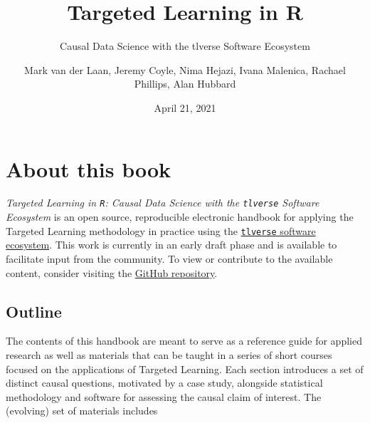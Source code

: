 \documentclass[12pt, krantz2,]{krantz}
\title{Targeted Learning in R}
\subtitle{Causal Data Science with the tlverse Software Ecosystem}
\author{Mark van der Laan, Jeremy Coyle, Nima Hejazi, Ivana Malenica, Rachael Phillips, Alan Hubbard}
\date{April 21, 2021}
\theoremstyle{definition}
\theoremstyle{definition}
\theoremstyle{definition}
\newcommand{\1}{\mathbbm{1}}
\begin{document}
\maketitle


\thispagestyle{empty}

\begin{center}
\end{center}

\setlength{\abovedisplayskip}{-5pt}
\setlength{\abovedisplayshortskip}{-5pt}

\mainmatter

{
\hypersetup{linkcolor=}
\setcounter{tocdepth}{3}
\tableofcontents
}
\listoftables
\listoffigures
\hypertarget{about-this-book}{%
\section*{About this book}\label{about-this-book}}


\emph{Targeted Learning in \texttt{R}: Causal Data Science with the \texttt{tlverse} Software
Ecosystem} is an open source, reproducible electronic handbook for applying the
Targeted Learning methodology in practice using the \href{https://github.com/tlverse}{\texttt{tlverse} software
ecosystem}. This work is currently in an early draft
phase and is available to facilitate input from the community. To view or
contribute to the available content, consider visiting the \href{https://github.com/tlverse/tlverse-handbook}{GitHub
repository}.

\hypertarget{outline}{%
\subsection{Outline}\label{outline}}

The contents of this handbook are meant to serve as a reference guide for
applied research as well as materials that can be taught in a series of short
courses focused on the applications of Targeted Learning. Each section
introduces a set of distinct causal questions, motivated by a case study,
alongside statistical methodology and software for assessing the causal claim of
interest. The (evolving) set of materials includes
\end{document}
